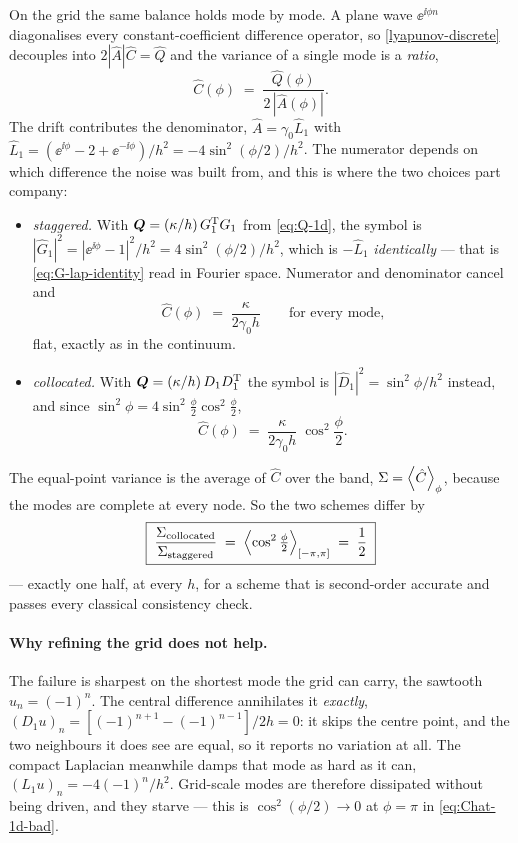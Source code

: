 \documentclass[a5paper]{article}
\begin{document}
On the grid the same balance holds mode by mode. A plane wave $\ee^{\ii\phi n}$ diagonalises every constant-coefficient difference operator, so \eqref{lyapunov-discrete} decouples into $2|\hat A|\hat C = \hat Q$ and the variance of a single mode is a \emph{ratio},
\begin{equation}
    \label{eq:mode-balance}
    \hat C(\phi) \;=\; \frac{\hat Q(\phi)}{2\,|\hat A(\phi)|}.
\end{equation}
The drift contributes the denominator, $\hat A = \gamma_0\hat L_1$ with $\hat L_1 = (\ee^{\ii\phi}-2+\ee^{-\ii\phi})/h^2 = -4\sin^2(\phi/2)/h^2$. The numerator depends on which difference the noise was built from, and this is where the two choices part company:
\begin{itemize}
    \item \emph{staggered.} With $\boldsymbol Q = (\kappa/h)\,G_1^{\mathrm{T}} G_1$ from \eqref{eq:Q-1d}, the symbol is $|\hat G_1|^2 = |\ee^{\ii\phi}-1|^2/h^2 = 4\sin^2(\phi/2)/h^2$, which is $-\hat L_1$ \emph{identically} --- that is \eqref{eq:G-lap-identity} read in Fourier space. Numerator and denominator cancel and
    \begin{equation}
        \label{eq:Chat-1d-good}
        \hat C(\phi) \;=\; \frac{\kappa}{2\gamma_0 h}\qquad\text{for every mode,}
    \end{equation}
    flat, exactly as in the continuum.
    \item \emph{collocated.} With $\boldsymbol Q = (\kappa/h)\,D_1D_1^{\mathrm{T}}$ the symbol is $|\hat D_1|^2 = \sin^2\phi/h^2$ instead, and since $\sin^2\phi = 4\sin^2\frac\phi2\cos^2\frac\phi2$,
    \begin{equation}
        \label{eq:Chat-1d-bad}
        \hat C(\phi) \;=\; \frac{\kappa}{2\gamma_0 h}\;\cos^2\frac{\phi}{2}.
    \end{equation}
\end{itemize}
The equal-point variance is the average of $\hat C$ over the band, $\Sigma = \left\langle\hat C\right\rangle_\phi$, because the modes are complete at every node. So the two schemes differ by
\begin{equation}
    \label{eq:half-1d}
    \boxed{\;\frac{\Sigma_\text{collocated}}{\Sigma_\text{staggered}}
    \;=\; \left\langle\cos^2\tfrac{\phi}{2}\right\rangle_{[-\pi,\pi]}
    \;=\; \frac12 \;}
\end{equation}
--- exactly one half, at every $h$, for a scheme that is second-order accurate and passes every classical consistency check.

\paragraph{Why refining the grid does not help.} The failure is sharpest on the shortest mode the grid can carry, the sawtooth $u_n=(-1)^n$. The central difference annihilates it \emph{exactly}, $(D_1u)_n = [(-1)^{n+1}-(-1)^{n-1}]/2h = 0$: it skips the centre point, and the two neighbours it does see are equal, so it reports no variation at all. The compact Laplacian meanwhile damps that mode as hard as it can, $(L_1u)_n = -4(-1)^n/h^2$. Grid-scale modes are therefore dissipated without being driven, and they starve --- this is $\cos^2(\phi/2)\to0$ at $\phi=\pi$ in \eqref{eq:Chat-1d-bad}.
\end{document}
